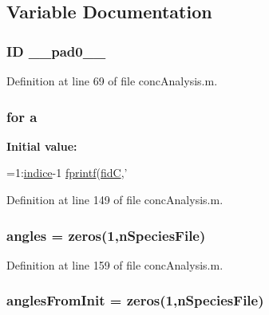 \subsection{Variable Documentation}
\hypertarget{a00025_a1bd174db58293f9130ed98bb375ccc03}{
\subsubsection[{\-\_\-\-\_\-pad0\-\_\-\-\_\-}]{\setlength{\rightskip}{0pt plus 5cm}I\-D \-\_\-\-\_\-pad0\-\_\-\-\_\-}}\label{a00025_a1bd174db58293f9130ed98bb375ccc03}


Definition at line 69 of file conc\-Analysis.\-m.

\hypertarget{a00025_a230414213a9710ed03b6cf8d2695ee94}{
\subsubsection[{a}]{\setlength{\rightskip}{0pt plus 5cm}for a}}\label{a00025_a230414213a9710ed03b6cf8d2695ee94}
{\bfseries Initial value\-:}
\begin{DoxyCode}
=1:\hyperlink{a00025_a776b2bbd08be028d44f6d4260f27633a}{indice}-1
                    \hyperlink{a00027_a21172d88d238291f06b91067ea53f814}{fprintf}(\hyperlink{a00025_a5650dbe23ad9065391c1ea56f8acd34c}{fidC},'%
\end{DoxyCode}


Definition at line 149 of file conc\-Analysis.\-m.

\hypertarget{a00025_aee6c8457aab4cc643bbdaea8794ca74e}{
\subsubsection[{angles}]{\setlength{\rightskip}{0pt plus 5cm}angles = zeros(1,n\-Species\-File)}}\label{a00025_aee6c8457aab4cc643bbdaea8794ca74e}


Definition at line 159 of file conc\-Analysis.\-m.

\hypertarget{a00025_a860d662b73220f44f28099dfa9d3de76}{
\subsubsection[{angles\-From\-Init}]{\setlength{\rightskip}{0pt plus 5cm}angles\-From\-Init = zeros(1,n\-Species\-File)}}\label{a00025_a860d662b73220f44f28099dfa9d3de76}


